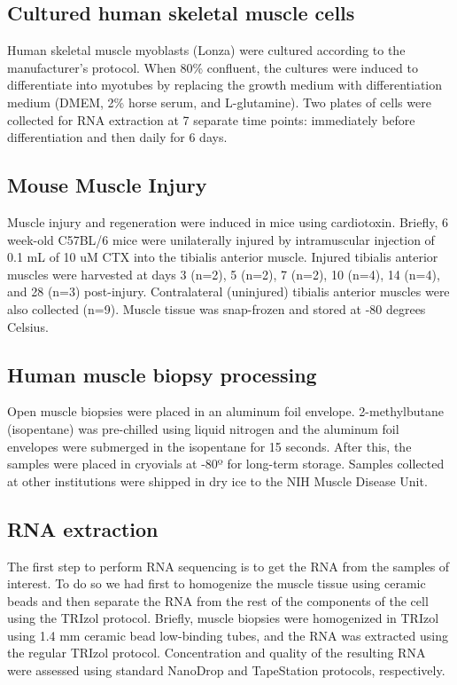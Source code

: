 \subsection{Cultured human skeletal muscle cells}
Human skeletal muscle myoblasts (Lonza) were cultured according to the manufacturer’s protocol. When 80\% confluent, the cultures were induced to differentiate into myotubes by replacing the growth medium with differentiation medium (DMEM, 2\% horse serum, and L-glutamine).  Two plates of cells were collected for RNA extraction at 7 separate time points: immediately before differentiation and then daily for 6 days.

\subsection{Mouse Muscle Injury}
Muscle injury and regeneration were induced in mice using cardiotoxin. Briefly, 6 week-old C57BL/6 mice were unilaterally injured by intramuscular injection of 0.1 mL of 10 uM CTX into the tibialis anterior muscle. Injured tibialis anterior muscles were harvested at days 3 (n=2), 5 (n=2), 7 (n=2), 10 (n=4), 14 (n=4), and 28 (n=3) post-injury. Contralateral (uninjured) tibialis anterior muscles were also collected (n=9). Muscle tissue was snap-frozen and stored at -80 degrees Celsius.

\subsection{Human muscle biopsy processing}
Open muscle biopsies were placed in an aluminum foil envelope. 2-methylbutane (isopentane) was pre-chilled using liquid nitrogen and the aluminum foil envelopes were submerged in the isopentane for 15 seconds. After this, the samples were placed in cryovials at -80º for long-term storage. Samples collected at other institutions were shipped in dry ice to the NIH Muscle Disease Unit.

\subsection{RNA extraction}
The first step to perform RNA sequencing is to get the RNA from the samples of interest. To do so we had first to homogenize the muscle tissue using ceramic beads and then separate the RNA from the rest of the components of the cell using the TRIzol protocol. Briefly, muscle biopsies were homogenized in TRIzol using 1.4 mm ceramic bead low-binding tubes, and the RNA was extracted using the regular TRIzol protocol. Concentration and quality of the resulting RNA were assessed using standard NanoDrop and TapeStation protocols, respectively.

